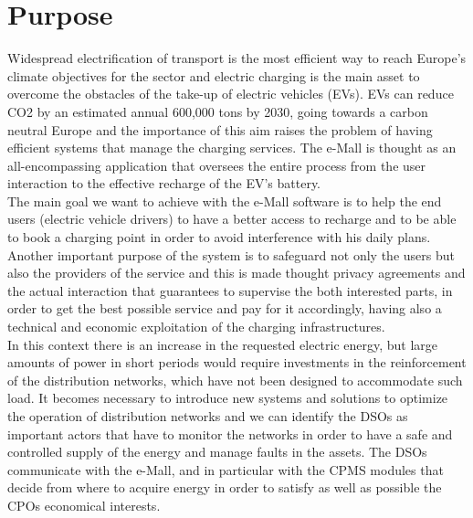 \section{Purpose}
\label{sec:purpose}%
Widespread electrification of transport is the most efficient way to reach Europe’s climate objectives for the sector and electric charging is the main asset to overcome the obstacles of the take-up of electric vehicles (EVs). EVs can reduce CO2 by an estimated annual 600,000 tons by 2030, going towards a carbon neutral Europe and the importance of this aim raises the problem of having efficient systems that manage the charging services. The e-Mall is thought as an all-encompassing application that oversees the entire process from the user interaction to the effective recharge of the EV's battery.\\

The main goal we want to achieve with the e-Mall software is to help the end users (electric vehicle drivers) to have a better access to recharge and to be able to book a charging point in order to avoid interference with his daily plans. Another important purpose of the system is to safeguard not only the users but also the providers of the service and this is made thought privacy agreements and the actual interaction that guarantees to supervise the both interested parts, in order to get the best possible service and pay for it accordingly, having also a technical and economic exploitation of the charging infrastructures. \\

In this context there is an increase in the requested electric energy, but large amounts of power in short periods would require investments in the reinforcement of the distribution networks, which have not been designed to accommodate such load. It becomes necessary to introduce new systems and solutions to optimize the operation of distribution networks and we can identify the DSOs as important actors that have to monitor the networks in order to have a safe and controlled supply of the energy and manage faults in the assets. The DSOs communicate with the e-Mall, and in particular with the CPMS modules that decide from where to acquire energy in order to satisfy as well as possible the CPOs economical interests.

